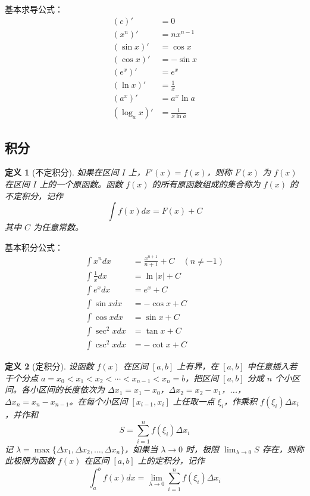 \documentclass[12pt]{article}
\newtheorem{definition}{定义}
\begin{document}
基本求导公式：
\begin{align}
(c)' &= 0 \\
(x^n)' &= nx^{n-1} \\
(\sin x)' &= \cos x \\
(\cos x)' &= -\sin x \\
(e^x)' &= e^x \\
(\ln x)' &= \frac{1}{x} \\
(a^x)' &= a^x \ln a \\
(\log_a x)' &= \frac{1}{x \ln a}
\end{align}

\subsection{积分}

\begin{definition}[不定积分]
如果在区间 $I$ 上，$F'(x) = f(x)$，则称 $F(x)$ 为 $f(x)$ 在区间 $I$ 上的一个原函数。函数 $f(x)$ 的所有原函数组成的集合称为 $f(x)$ 的不定积分，记作
$$\int f(x) dx = F(x) + C$$
其中 $C$ 为任意常数。
\end{definition}

基本积分公式：
\begin{align}
\int x^n dx &= \frac{x^{n+1}}{n+1} + C \quad (n \neq -1) \\
\int \frac{1}{x} dx &= \ln|x| + C \\
\int e^x dx &= e^x + C \\
\int \sin x dx &= -\cos x + C \\
\int \cos x dx &= \sin x + C \\
\int \sec^2 x dx &= \tan x + C \\
\int \csc^2 x dx &= -\cot x + C
\end{align}

\begin{definition}[定积分]
设函数 $f(x)$ 在区间 $[a, b]$ 上有界，在 $[a, b]$ 中任意插入若干个分点 $a = x_0 < x_1 < x_2 < \cdots < x_{n-1} < x_n = b$，把区间 $[a, b]$ 分成 $n$ 个小区间。各小区间的长度依次为 $\Delta x_1 = x_1 - x_0$，$\Delta x_2 = x_2 - x_1$，...，$\Delta x_n = x_n - x_{n-1}$。在每个小区间 $[x_{i-1}, x_i]$ 上任取一点 $\xi_i$，作乘积 $f(\xi_i) \Delta x_i$，并作和
$$S = \sum_{i=1}^{n} f(\xi_i) \Delta x_i$$
记 $\lambda = \max\{\Delta x_1, \Delta x_2, \ldots, \Delta x_n\}$，如果当 $\lambda \to 0$ 时，极限 $\lim_{\lambda \to 0} S$ 存在，则称此极限为函数 $f(x)$ 在区间 $[a, b]$ 上的定积分，记作
$$\int_a^b f(x) dx = \lim_{\lambda \to 0} \sum_{i=1}^{n} f(\xi_i) \Delta x_i$$
\end{definition}
\end{document}
